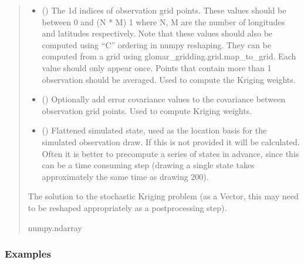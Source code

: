 \documentclass[letterpaper,10pt,english]{sphinxmanual}
\begin{document}
\begin{fulllineitems}
\begin{fulllineitems}
\begin{quote}
\begin{description}
\begin{itemize}
\item {}
\sphinxAtStartPar
{} () \textendash{} The 1d indices of observation grid points. These values should be
between 0 and (N * M) \sphinxhyphen{} 1 where N, M are the number of longitudes
and latitudes respectively. Note that these values should also be
computed using “C” ordering in numpy reshaping. They can be
computed from a grid using glomar\_gridding.grid.map\_to\_grid. Each
value should only appear once. Points that contain more than 1
observation should be averaged. Used to compute the Kriging weights.

\item {}
\sphinxAtStartPar
{} (\sphinxstyleliteralemphasis{\sphinxupquote{ | }}) \textendash{} Optionally add error covariance values to the covariance between
observation grid points. Used to compute Kriging weights.

\item {}
\sphinxAtStartPar
{} (\sphinxstyleliteralemphasis{\sphinxupquote{ | }}) \textendash{} Flattened simulated state, used as the location basis for the
simulated observation draw. If this is not provided it will be
calculated. Often it is better to pre\sphinxhyphen{}compute a series of states in
advance, since this can be a time consuming step (drawing a single
state takes approximately the same time as drawing 200).

\end{itemize}

\sphinxAtStartPar
The solution to the stochastic Kriging problem (as a Vector, this
may need to be re\sphinxhyphen{}shaped appropriately as a post\sphinxhyphen{}processing step).

\sphinxAtStartPar
numpy.ndarray

\end{description}\end{quote}
\subsubsection*{Examples}


\end{fulllineitems}
\end{fulllineitems}
\end{document}
